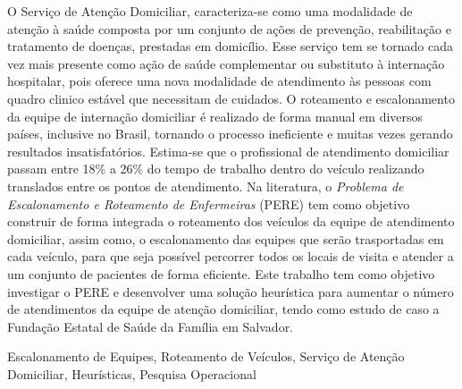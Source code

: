 
\resumo
O Serviço de Atenção Domiciliar, caracteriza-se como uma modalidade de atenção à saúde composta por um conjunto de ações de prevenção, reabilitação e tratamento de doenças, prestadas em domicílio. Esse serviço tem se tornado cada vez mais presente como ação de saúde complementar ou substituto à internação hospitalar, pois oferece uma nova modalidade de atendimento às pessoas com quadro clinico estável que necessitam de cuidados. O roteamento e escalonamento da equipe de internação domiciliar é realizado de forma manual em diversos países, inclusive no Brasil, tornando o processo ineficiente e muitas vezes gerando resultados insatisfatórios. Estima-se que o profissional de atendimento domiciliar passam entre 18\% a 26\% do tempo de trabalho dentro do veículo realizando translados entre os pontos de atendimento. Na literatura, o \textit{Problema de Escalonamento e Roteamento de Enfermeiras} (PERE) tem como objetivo construir de forma integrada o roteamento dos veículos da equipe de atendimento domiciliar, assim como, o escalonamento das equipes que serão trasportadas em cada veículo, para que seja possível percorrer todos os locais de visita e atender a um conjunto de pacientes de forma eficiente. Este trabalho tem como objetivo investigar o PERE e desenvolver uma solução heurística para aumentar o número de atendimentos da equipe de atenção domiciliar, tendo como estudo de caso a Fundação Estatal de Saúde da Família em Salvador.
\begin{keywords}
Escalonamento de Equipes, Roteamento de Veículos, Serviço de Atenção Domiciliar, Heurísticas, Pesquisa Operacional
\end{keywords}


